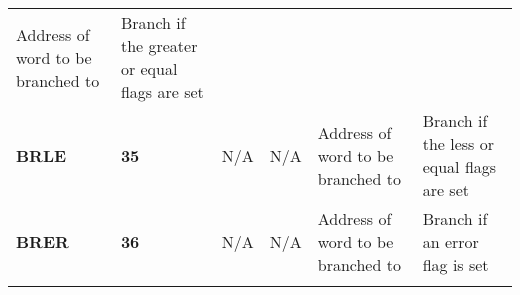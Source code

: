 \documentclass[]{article}
\begin{document}
\begin{longtable}[c]{@{}llllll@{}}
\begin{minipage}[t]{0.14\columnwidth}\raggedright\strut
Address of word to be branched to
\strut\end{minipage} &
\begin{minipage}[t]{0.14\columnwidth}\raggedright\strut
Branch if the greater or equal flags are set
\strut\end{minipage}\tabularnewline
\begin{minipage}[t]{0.14\columnwidth}\raggedright\strut
\textbf{BRLE}
\strut\end{minipage} &
\begin{minipage}[t]{0.14\columnwidth}\raggedright\strut
\textbf{35}
\strut\end{minipage} &
\begin{minipage}[t]{0.14\columnwidth}\raggedright\strut
N/A
\strut\end{minipage} &
\begin{minipage}[t]{0.14\columnwidth}\raggedright\strut
N/A
\strut\end{minipage} &
\begin{minipage}[t]{0.14\columnwidth}\raggedright\strut
Address of word to be branched to
\strut\end{minipage} &
\begin{minipage}[t]{0.14\columnwidth}\raggedright\strut
Branch if the less or equal flags are set
\strut\end{minipage}\tabularnewline
\begin{minipage}[t]{0.14\columnwidth}\raggedright\strut
\textbf{BRER}
\strut\end{minipage} &
\begin{minipage}[t]{0.14\columnwidth}\raggedright\strut
\textbf{36}
\strut\end{minipage} &
\begin{minipage}[t]{0.14\columnwidth}\raggedright\strut
N/A
\strut\end{minipage} &
\begin{minipage}[t]{0.14\columnwidth}\raggedright\strut
N/A
\strut\end{minipage} &
\begin{minipage}[t]{0.14\columnwidth}\raggedright\strut
Address of word to be branched to
\strut\end{minipage} &
\begin{minipage}[t]{0.14\columnwidth}\raggedright\strut
Branch if an error flag is set
\strut\end{minipage}\tabularnewline
\begin{minipage}[t]{0.14\columnwidth}\raggedright\strut

\end{minipage}
\end{longtable}
\end{document}
